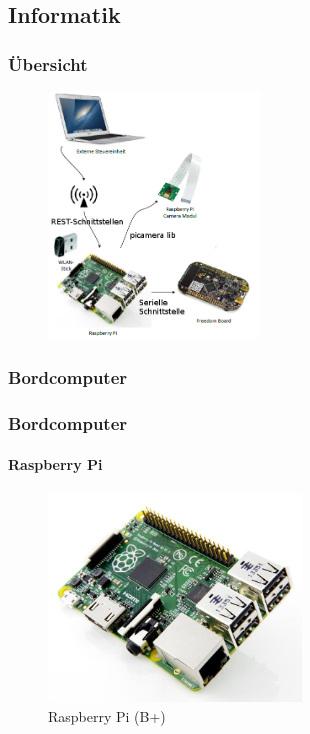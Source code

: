 \subsection{Informatik}

\author{Alexander Suter}

\begin{frame}
	\frametitle{Übersicht\hfill{}\footnotesize \group}

	\begin{figure}
		\centering
		\includegraphics[width=0.5\textwidth]{../../fig/blockdiagramm-informatik.png}
	\end{figure}

\end{frame}

\subsubsection{Bordcomputer}
\begin{frame}
	\frametitle{Bordcomputer\hfill{}\footnotesize \group}
	\framesubtitle{Raspberry Pi}
	
	\begin{figure}
		\centering
		\includegraphics[width=0.6\textwidth]{../../fig/raspberry-pi-b-plus.jpg}
		\caption{Raspberry Pi (B+)}
	\end{figure}
	
	
\end{frame}

